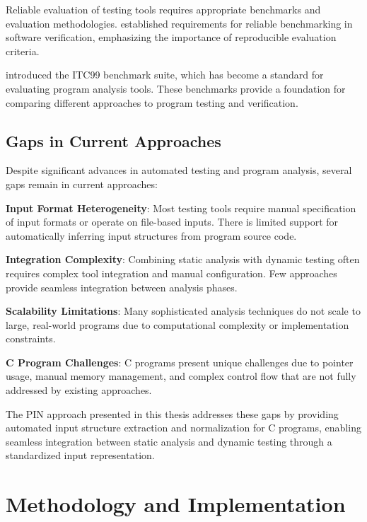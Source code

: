 \documentclass[doublespace,nopageskip]{VTthesis} %
\begin{document}
    Reliable evaluation of testing tools requires appropriate benchmarks and evaluation methodologies. \citet{beyer2019reliable} established requirements for reliable benchmarking in software verification, emphasizing the importance of reproducible evaluation criteria.
    
    \citet{itc2007} introduced the ITC99 benchmark suite, which has become a standard for evaluating program analysis tools. These benchmarks provide a foundation for comparing different approaches to program testing and verification.
    
    \section{Gaps in Current Approaches} \label{se:literature_gaps}
    
    Despite significant advances in automated testing and program analysis, several gaps remain in current approaches:
    
    \textbf{Input Format Heterogeneity}: Most testing tools require manual specification of input formats or operate on file-based inputs. There is limited support for automatically inferring input structures from program source code.
    
    \textbf{Integration Complexity}: Combining static analysis with dynamic testing often requires complex tool integration and manual configuration. Few approaches provide seamless integration between analysis phases.
    
    \textbf{Scalability Limitations}: Many sophisticated analysis techniques do not scale to large, real-world programs due to computational complexity or implementation constraints.
    
    \textbf{C Program Challenges}: C programs present unique challenges due to pointer usage, manual memory management, and complex control flow that are not fully addressed by existing approaches.
    
    The PIN approach presented in this thesis addresses these gaps by providing automated input structure extraction and normalization for C programs, enabling seamless integration between static analysis and dynamic testing through a standardized input representation.
	
	\chapter{Methodology and Implementation} \label{ch:results}
	
\end{document}
